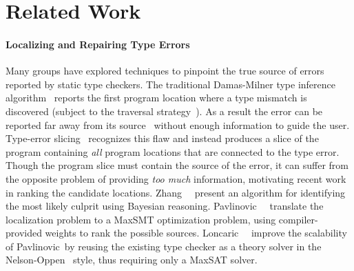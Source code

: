\section{Related Work}
\label{sec:nanomaly:related-work}


\paragraph{Localizing and Repairing Type Errors}
\label{sec:nanomaly:diagnosis-repair}
%
Many groups have explored techniques to pinpoint the true source
of errors reported by static type checkers.
%
The traditional Damas-Milner type inference algorithm~\cite{Damas1982-uw}
reports the first program location where a type mismatch is discovered
(subject to the traversal strategy~\cite{Lee1998-ys}).
%
As a result the error can be reported far away from its
source~\cite{McAdam1998-ub} without enough information to guide the
user.
%
Type-error slicing~\cite{Haack2003-vc,Schilling2011-yf,Rahli2015-tt,Sagonas2013-bf,Gast2004-zd,Neubauer2003-xv}
recognizes this flaw and instead produces a slice of the program
containing \emph{all} program locations that are connected to the type
error.
%
%
Though the program slice must contain the source of the error, it can
suffer from the opposite problem of providing \emph{too much}
information, motivating recent work in ranking the candidate locations.
%
Zhang~\etal~\citealt{Zhang2014-lv,Zhang2015-yu} present an algorithm for
identifying the most likely culprit using Bayesian reasoning.
%
Pavlinovic~\etal~\citealt{Pavlinovic2014-mr,Pavlinovic2015-kh}
translate the %
localization problem to a MaxSMT optimization problem, using
compiler-provided weights to rank the possible sources.
%
Loncaric~\etal~\citealt{Loncaric2016-uk} improve the scalability of
Pavlinovic~\etal by reusing the existing type checker as
a theory solver in the Nelson-Oppen~\citealt{Nelson1979-td}
style, thus requiring only a MaxSAT solver.

